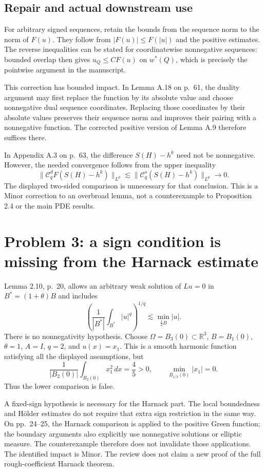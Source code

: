 \documentclass[10pt]{article}
\begin{document}
\subsection*{Repair and actual downstream use}
For arbitrary signed sequences, retain the bounds from the sequence norm to the norm of \(F(u)\). They follow from \(|F(u)|\leq F(|u|)\) and the positive estimates. The reverse inequalities can be stated for coordinatewise nonnegative sequences: bounded overlap then gives \(u_Q\leq C F(u)\) on \(w^*(Q)\), which is precisely the pointwise argument in the manuscript.\par
This correction has bounded impact. In Lemma A.18 on p. 61, the duality argument may first replace the function by its absolute value and choose nonnegative dual sequence coordinates. Replacing those coordinates by their absolute values preserves their sequence norm and improves their pairing with a nonnegative function. The corrected positive version of Lemma A.9 therefore suffices there.\par
In Appendix A.3 on p. 63, the difference \(S(H)-h^k\) need not be nonnegative. However, the needed convergence follows from the upper inequality \[\|\mathcal C_q^d F(S(H)-h^k)\|_{L^p}
 \lesssim\|\mathcal C_q^s(S(H)-h^k)\|_{L^p}\longrightarrow0.\] The displayed two-sided comparison is unnecessary for that conclusion. This is a Minor correction to an overbroad lemma, not a counterexample to Proposition 2.4 or the main PDE results.\par
\section*{Problem 3: a sign condition is missing from the Harnack estimate}
Lemma 2.10, p. 20, allows an arbitrary weak solution of \(Lu=0\) in \(B^*=(1+\theta)B\) and includes \[\left(\frac{1}{|B^*|}\int_{B^*}|u|^q\right)^{1/q}
 \lesssim\min_{\frac12B}|u|.\] There is no nonnegativity hypothesis. Choose \(\Omega=B_3(0)\subset\mathbb R^3\), \(B=B_1(0)\), \(\theta=1\), \(A=I\), \(q=2\), and \(u(x)=x_1\). This is a smooth harmonic function satisfying all the displayed assumptions, but \[\frac{1}{|B_2(0)|}\int_{B_2(0)}x_1^2\,dx=\frac45>0,
 \qquad \min_{B_{1/2}(0)}|x_1|=0.\] Thus the lower comparison is false.\par
A fixed-sign hypothesis is necessary for the Harnack part. The local boundedness and Hölder estimates do not require that extra sign restriction in the same way. On pp. 24–25, the Harnack comparison is applied to the positive Green function; the boundary arguments also explicitly use nonnegative solutions or elliptic measure. The counterexample therefore does not invalidate those applications. The identified impact is Minor. The review does not claim a new proof of the full rough-coefficient Harnack theorem.\par
\end{document}
